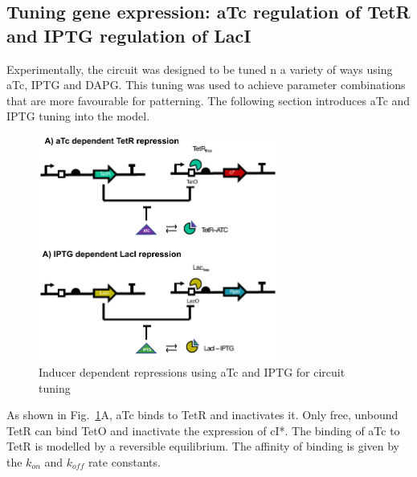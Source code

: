\subsection{Tuning gene expression: aTc regulation of TetR and IPTG regulation of LacI }



Experimentally, the circuit was designed to be tuned n a variety of ways using aTc, IPTG and DAPG.
This tuning was used to achieve parameter combinations that are more favourable for patterning.
The following section introduces aTc and IPTG tuning into the model.

\begin{figure}[H] %
    \centering
    \begin{adjustbox}{center}
        \includegraphics[width=0.7\textwidth]{chapters/Chapter 2/inducers} %
    \end{adjustbox}
    \caption{Inducer dependent repressions using aTc and IPTG for circuit tuning}
    \label{fig:inducers} %
\end{figure}

As shown in Fig.~\ref{fig:inducers}A, aTc binds to TetR and inactivates it.
Only free, unbound TetR can bind TetO and inactivate the expression of cI*.
The binding of aTc to TetR is modelled by a reversible equilibrium.
The affinity of binding is given by the $k_{on}$ and $k_{off}$ rate constants.



